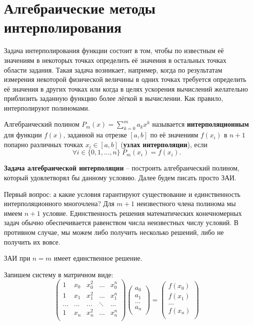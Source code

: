 \documentclass[../main.tex]{subfile}
\begin{document}
\section{Алгебраические методы интерполирования}
Задача интерполирования функции состоит в том, чтобы по известным её значениям
в некоторых точках определить её значения в остальных точках области задания.
Такая задача возникает, например, когда по результатам измерения некоторой
физической величины в одних точках требуется определить её значения в других
точках или когда в целях ускорения вычислений желательно приблизить заданную
функцию более лёгкой в вычислении. Как правило, интерполируют полиномами.

\begin{define}
	Алгебраический полином $P_m(x)=\sum_{k=0}^{m}a_kx^k$ называется
	\textbf{интерполяционным} для функции $f(x)$, заданной на отрезке
	$[a,b]$ по её значениям $f(x_i)$ в $n+1$ попарно различных точках
	$x_i\in[a,b]$ (\textbf{узлах интерполяции}), если
	\[\forall i\in\{0,1,...,n\}\;P_m(x_i)=f(x_i).\]

	\textbf{Задача алгебраической интерполяции} -- построить алгебраический
	полином, который удовлетворял бы данному условию. Далее будем писать
	просто ЗАИ.
\end{define}

Первый вопрос: а какие условия гарантируют существование и единственность
интерполяционного многочлена? Для $m+1$ неизвестного члена полинома мы имеем
$n+1$ условие. Единственность решения математических конечномерных задач
обычно обеспечивается равенством числа неизвестных числу условий. В противном
случае, мы можем либо получить несколько решений, либо не получить их вовсе.

\begin{theorem}
\label{eq:polynominal_theorem}
	ЗАИ при $n=m$ имеет единственное решение.
\end{theorem}

\beginproof

	Запишем систему в матричном виде:
	\[
	\begin{pmatrix}
		1	& x_0	& x_0^2	& ...	& x_0^n \\
		1	& x_1	& x_1^2	& ...	& x_1^n \\
		...	& ...	& ...	&\ddots	& ...	\\
		1	& x_n	& x_n^2	& ...	& x_n^n \\
	\end{pmatrix}
	\begin{pmatrix}
		a_0 \\
		a_1 \\
		... \\
		a_n \\
	\end{pmatrix}
	=
	\begin{pmatrix}
		f(x_0)	\\
		f(x_1)	\\
		...	\\
		f(x_n)	\\
	\end{pmatrix}
	\]
\end{document}
